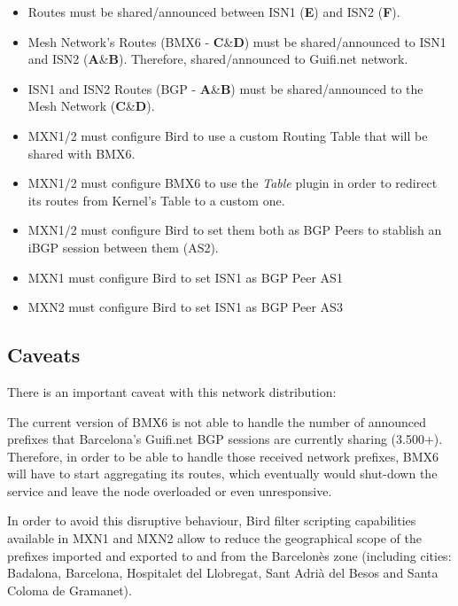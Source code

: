\begin{itemize}
    \item Routes must be shared/announced between ISN1 (\textbf{E}) and ISN2 (\textbf{F}).
    \item Mesh Network's Routes (BMX6 - \textbf{C}\&\textbf{D}) must be shared/announced to ISN1 and ISN2 (\textbf{A}\&\textbf{B}). Therefore, shared/announced to Guifi.net network.
    \item ISN1 and ISN2 Routes (BGP - \textbf{A}\&\textbf{B}) must be shared/announced to the Mesh Network (\textbf{C}\&\textbf{D}).
    \item MXN1/2 must configure Bird to use a custom Routing Table that will be shared with BMX6.
    \item MXN1/2 must configure BMX6 to use the \textit{Table} plugin in order to redirect its routes from Kernel's Table to a custom one.
    \item MXN1/2 must configure Bird to set them both as BGP Peers to stablish an iBGP session between them (AS2).
    \item MXN1 must configure Bird to set ISN1 as BGP Peer AS1
    \item MXN2 must configure Bird to set ISN1 as BGP Peer AS3
\end{itemize}

\subsection{Caveats}
There is an important caveat with this network distribution:

The current version of BMX6 is not able to handle the number of announced prefixes that Barcelona's Guifi.net BGP sessions are currently sharing (3.500+). Therefore, in order to be able to handle those received network prefixes, BMX6 will have to start aggregating its routes, which eventually would shut-down the service and leave the node overloaded or even unresponsive.

In order to avoid this disruptive behaviour, Bird filter scripting capabilities available in MXN1 and MXN2 allow to reduce the geographical scope of the prefixes imported and exported to and from the Barcelon\`{e}s zone (including cities: Badalona, Barcelona, Hospitalet del Llobregat, Sant Adri\`{a} del Besos and Santa Coloma de Gramanet).

